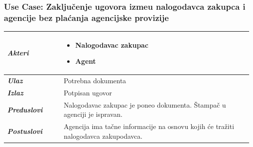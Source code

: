 \documentclass[20pt]{article}
\begin{document}
\newpage
{}
\setlength{\parindent}{1cm}
\fontsize{13}{18} \selectfont 


\subsubsection{\bfseries \large Use Case: Zaklju\v {c}enje ugovora izme\dj u nalogodavca zakupca i agencije bez pla\' canja agencijske provizije}
\begin{center}
\begin{longtable}{p{0.23\linewidth} p{0.77\linewidth}}
 \hline
 {\it \bfseries Akteri} & \begin{itemize}
    \item Nalogodavac zakupac
    \item Agent
\end{itemize}\\
\hline

 {\it \bfseries Ulaz} & Potrebna dokumenta\\
 \hline
 
 {\it \bfseries Izlaz} & Potpisan ugovor\\
 \hline
 
 {\it \bfseries Preduslovi} & Nalogodavac zakupac je poneo dokumenta. \v {S}tampa\v {c} u agenciji je ispravan. \\
 \hline
 
 {\it \bfseries Postuslovi} & Agencija ima ta\v {c}ne informacije na osnovu kojih \' ce tra\v {z}iti nalogodavca zakupodavca. \\
 \hline


\end{longtable}
\end{center}
\end{document}
